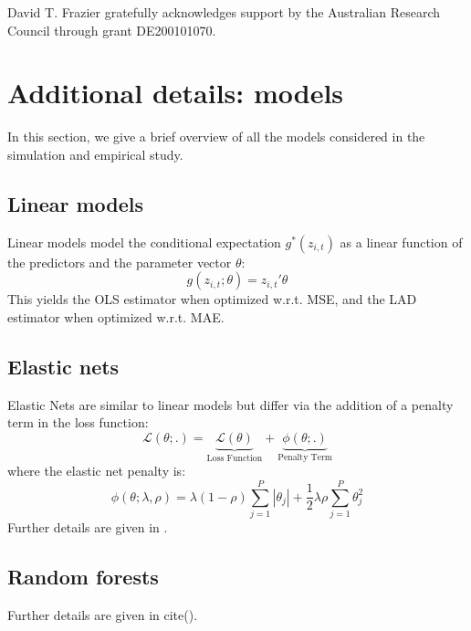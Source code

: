 \documentclass{article}
\begin{document}
\begin{ack}
	David T. Frazier gratefully acknowledges support by the Australian Research Council through grant DE200101070.
\end{ack}




\appendix 

\section{Additional details: models}\label{app:models}
In this section, we give a brief overview of all the models considered in the simulation and empirical study.

\subsection{Linear models}
Linear models model the conditional expectation \( g^*(z_{i, t}) \) as a linear function of the predictors and the parameter vector \( \theta \):
\begin{equation}
g(z_{i, t};\theta) = z_{i, t}' \theta
\end{equation}
This yields the OLS estimator when optimized w.r.t. MSE, and the LAD estimator when optimized w.r.t. MAE.

\subsection{Elastic nets}
Elastic Nets are similar to linear models but differ via the addition of a penalty term in the loss function:
\begin{equation}
\mathcal{L(\theta;.)} = 
\underset{\text{Loss Function}}{\underbrace{\mathcal{L(\theta)}}} + 
\underset{\text{Penalty Term}}{\underbrace{\phi(\theta;.)}}
\end{equation}
where the elastic net penalty \cite{zou_regularization_2005} is:
\begin{equation}
\phi(\theta;\lambda,\rho) = 
\lambda(1-\rho) \sum_{j = 1}^{P}|\theta_j| +
\frac{1}{2} \lambda \rho \sum_{j = 1}^{P}\theta_j^2
\end{equation}
Further details are given in \cite{zou_regularization_2005}.

\subsection{Random forests}

Further details are given in cite().
\end{document}
